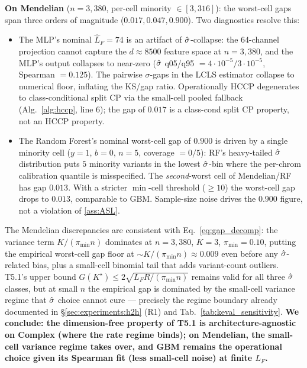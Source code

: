 \textbf{On Mendelian} ($n = 3{,}380$, per-cell minority $\in [3, 316]$): the
worst-cell gaps span three orders of magnitude ($0.017, 0.047, 0.900$). Two
diagnostics resolve this:
\begin{itemize}
\item The MLP's nominal $\hat L_F = 74$ is an artifact of $\hat{\sigma}$-collapse:
the 64-channel projection cannot capture the $d \approx 8500$ feature space at
$n = 3{,}380$, and the MLP's output collapses to near-zero ($\hat{\sigma}$ q05/q95 $=
4{\cdot}10^{-5} / 3{\cdot}10^{-5}$, Spearman $= 0.125$). The pairwise
$\sigma$-gaps in the LCLS estimator collapse to numerical floor, inflating the
KS/gap ratio. Operationally HCCP degenerates to class-conditional split CP via
the small-cell pooled fallback (Alg.~\ref{alg:hccp}, line 6); the gap of
$0.017$ is a class-cond split CP property, not an HCCP property.
\item The Random Forest's nominal worst-cell gap of $0.900$ is driven by a
single minority cell ($y = 1$, $b = 0$, $n = 5$, coverage $= 0/5$): RF's
heavy-tailed $\hat{\sigma}$ distribution puts $5$ minority variants in the lowest
$\hat{\sigma}$-bin where the per-chrom calibration quantile is misspecified. The
\emph{second}-worst cell of Mendelian/RF has gap $0.013$. With a stricter
$\min$-cell threshold ($\geq 10$) the worst-cell gap drops to $0.013$,
comparable to GBM. Sample-size noise drives the $0.900$ figure, not a
violation of \ref{ass:ASL}.
\end{itemize}

The Mendelian discrepancies are consistent with Eq.~\eqref{eq:gap_decomp}:
the variance term $K / (\pi_{\min} n)$ dominates at $n = 3{,}380$, $K = 3$,
$\pi_{\min} = 0.10$, putting the empirical worst-cell gap floor at
$\sim K / (\pi_{\min} n) \approx 0.009$ even before any $\hat{\sigma}$-related bias,
plus a small-cell binomial tail that adds variant-count outliers. T5.1's
upper bound $G(K^\star) \leq 2 \sqrt{L_F R / (\pi_{\min} n)}$ remains valid for
all three $\hat{\sigma}$ classes, but at small $n$ the empirical gap is dominated by
the small-cell variance regime that $\hat{\sigma}$ choice cannot cure --- precisely
the regime boundary already documented in \S\ref{sec:experiments:h2h} (R1) and
Tab.~\ref{tab:keval_sensitivity}. \textbf{We conclude: the dimension-free
property of T5.1 is architecture-agnostic on Complex (where the rate regime
binds); on Mendelian, the small-cell variance regime takes over, and GBM
remains the operational choice given its Spearman fit (less small-cell noise)
at finite $L_F$.}
